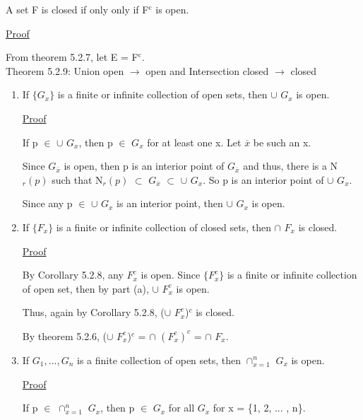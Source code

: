 	\begin{adjustbox}{minipage=14cm, right}
		A set F is closed if only only if F$^\text{c}$ is open.
	\end{adjustbox}

{ \color{magenta} \underline{Proof} } 

	From {\color{red} theorem 5.2.7}, let E = F$^\text{c}$. \\

{ \color{red} Theorem 5.2.9: Union open $\rightarrow$ open and
Intersection closed $\rightarrow$ closed } 

	\begin{enumerate}[label=(\alph*), leftmargin=2cm, itemsep=0.4em]
		\item If $\{G_x\}$ is a finite or infinite collection of open sets,
		then $\cup$ $G_x$ is open.

			{ \color{magenta} \underline{Proof} }

				If p $\in$ $\cup$ $G_x$, then p $\in$ $G_x$ for at least one x.
				Let $\overline{x}$ be such an x.

				Since $G_{\overline{x}}$ is open, then p is an interior point of
				$G_{\overline{x}}$ and thus, there is a N$_r(p)$ such that
				N$_r(p)$ $\subset$ $G_{\overline{x}}$ $\subset$ $\cup$ $G_x$.
				So p is an interior point of $\cup$ $G_x$.

				Since any p $\in$ $\cup$ $G_x$ is an interior point, then
				$\cup$ $G_x$ is open.

		\item If $\{F_x\}$ is a finite or infinite collection of closed sets,
		then $\cap$ $F_x$ is closed.

			{ \color{magenta} \underline{Proof} }

				By {\color{orange} Corollary 5.2.8}, any $F_x^c$ is open.
				Since $\{F_x^c\}$ is a finite or infinite collection of
				open set, then by part (a), $\cup$ $F_x^c$ is open.

				Thus, again by {\color{orange} Corollary 5.2.8},
				($\cup$ $F_x^c$)$^c$ is closed.

				By {\color{red} theorem 5.2.6},
				($\cup$ $F_x^c$)$^c$ = $\cap$ $(F_x^c)^c$
				= $\cap$ $F_x$.
				
		\item If $G_1, ... , G_n$ is a finite collection of open sets,
		then $\cap_{x=1}^n$ $G_x$ is open.

			{ \color{magenta} \underline{Proof} }

				If p $\in$ $\cap_{x=1}^n$ $G_x$, then p $\in$ $G_x$ for
				all $G_x$ for x = \{1, 2, ... , n\}.


\end{enumerate}
